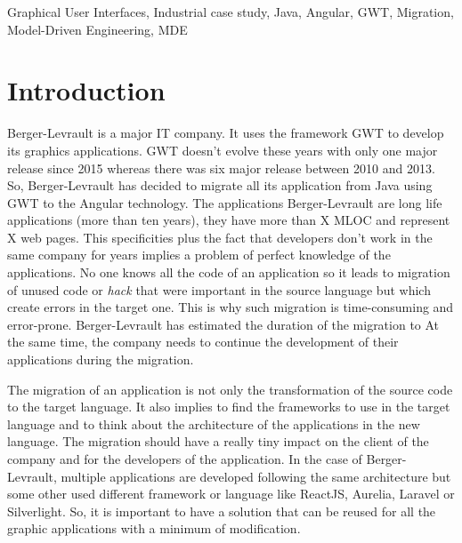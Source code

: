 \documentclass[conference]{IEEEtran}
\begin{document}
\begin{IEEEkeywords}
    Graphical User Interfaces, Industrial case study, Java, Angular, GWT, 
    Migration, Model-Driven Engineering, MDE
\end{IEEEkeywords}


\section{Introduction}
\label{sec:intro}


Berger-Levrault is a major IT company.
It uses the framework GWT to develop its graphics applications.
GWT doesn't evolve these years with only one major release since 2015 whereas there was six major release between 2010 and 2013.
So, Berger-Levrault has decided to migrate all its application from Java using GWT to the Angular technology.
The applications Berger-Levrault are long life applications (more than ten years),
    they have more than X MLOC and represent
    X web pages. 
This specificities plus the fact that developers don't work in the same company for years implies
    a problem of perfect knowledge of the applications.
No one knows all the code of an application so it leads to migration of unused code or 
    \emph{hack} that were important in the source language but which create errors in the target one.
This is why such migration is time-consuming and error-prone.
Berger-Levrault has estimated the duration of the migration to
At the same time, the company needs to continue the development of their applications during the migration.


The migration of an application is not only the transformation of the source code to the target language. 
It also implies to find the frameworks to use in the target language 
    and to think about the architecture of the applications in the new language.
The migration should have a really tiny impact on the client of the company and for the developers of the application.
In the case of Berger-Levrault, multiple applications are developed following the same architecture
    but some other used different framework or language like ReactJS, Aurelia, Laravel or Silverlight.
So, it is important to have a solution that can be reused for all the graphic applications with a minimum of modification.
\end{document}
